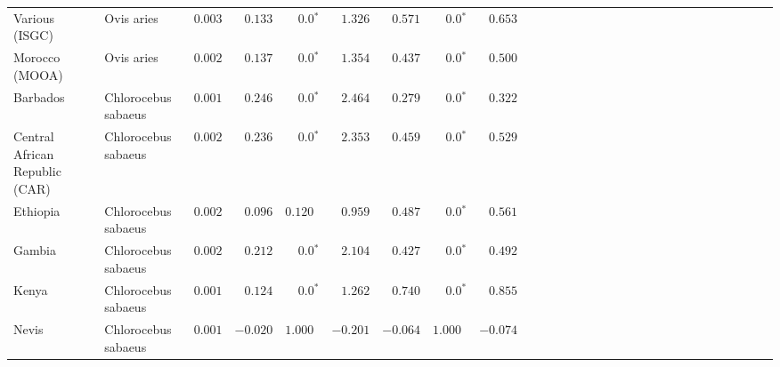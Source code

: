 \begin{center}
\begin{adjustbox}{width = 1\textwidth}
\begin{tabular}{|l|l|r|r|r|r|r|r|r|r|r|r|r|r|r|r|r|r|r|r|r|r|r|r|r|r|r|r|r|}
                 Various (ISGC) &           Ovis aries &           $ 0.003$ &                      $ 0.133$ &                  $\bm{0.0{^*}}$ &                                           $ 1.326$ &                      $ 0.571$ &                  $\bm{0.0{^*}}$ &                                           $ 0.653$ \\
                 Morocco (MOOA) &           Ovis aries &           $ 0.002$ &                      $ 0.137$ &                  $\bm{0.0{^*}}$ &                                           $ 1.354$ &                      $ 0.437$ &                  $\bm{0.0{^*}}$ &                                           $ 0.500$ \\
                       Barbados &  Chlorocebus sabaeus &           $ 0.001$ &                      $ 0.246$ &                  $\bm{0.0{^*}}$ &                                           $ 2.464$ &                      $ 0.279$ &                  $\bm{0.0{^*}}$ &                                           $ 0.322$ \\
 Central African Republic (CAR) &  Chlorocebus sabaeus &           $ 0.002$ &                      $ 0.236$ &                  $\bm{0.0{^*}}$ &                                           $ 2.353$ &                      $ 0.459$ &                  $\bm{0.0{^*}}$ &                                           $ 0.529$ \\
                       Ethiopia &  Chlorocebus sabaeus &           $ 0.002$ &                      $ 0.096$ &                      $ 0.120~~$ &                                           $ 0.959$ &                      $ 0.487$ &                  $\bm{0.0{^*}}$ &                                           $ 0.561$ \\
                         Gambia &  Chlorocebus sabaeus &           $ 0.002$ &                      $ 0.212$ &                  $\bm{0.0{^*}}$ &                                           $ 2.104$ &                      $ 0.427$ &                  $\bm{0.0{^*}}$ &                                           $ 0.492$ \\
                          Kenya &  Chlorocebus sabaeus &           $ 0.001$ &                      $ 0.124$ &                  $\bm{0.0{^*}}$ &                                           $ 1.262$ &                      $ 0.740$ &                  $\bm{0.0{^*}}$ &                                           $ 0.855$ \\
                          Nevis &  Chlorocebus sabaeus &           $ 0.001$ &                      $-0.020$ &                      $ 1.000~~$ &                                           $-0.201$ &                      $-0.064$ &                      $ 1.000~~$ &                                           $-0.074$ \\

\end{tabular}
\end{adjustbox}
\end{center}
